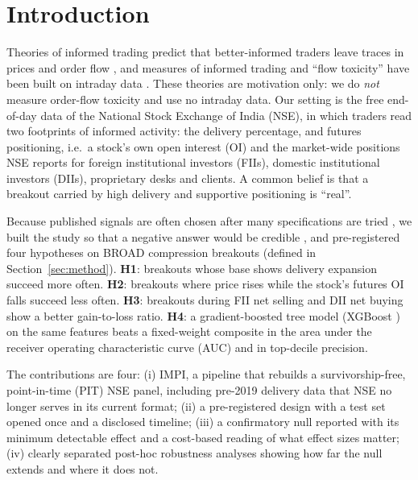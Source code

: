 \documentclass[conference]{IEEEtran}
\begin{document}
\section{Introduction}
Theories of informed trading predict that better-informed traders leave traces in prices and order flow
\cite{kyle1985,glosten1985}, and measures of informed trading and ``flow toxicity'' have been built on
intraday data \cite{easley1996,easley2012}. These theories are motivation only: we do \emph{not} measure
order-flow toxicity and use no intraday data. Our setting is the free end-of-day data of the National Stock
Exchange of India (NSE), in which traders read two footprints of informed activity: the delivery percentage,
and futures positioning, i.e.\ a stock's own open interest (OI) and the market-wide positions NSE reports for
foreign institutional investors (FIIs), domestic institutional investors (DIIs), proprietary desks and
clients. A common belief is that a breakout carried by high delivery and supportive positioning is ``real''.

Because published signals are often chosen after many specifications are tried \cite{harvey2016,bailey2014pseudo},
we built the study so that a negative answer would be credible \cite{nosek2018}, and pre-registered four
hypotheses on BROAD compression breakouts (defined in Section~\ref{sec:method}). \textbf{H1}: breakouts whose
base shows delivery expansion succeed more often. \textbf{H2}: breakouts where price rises while the stock's
futures OI falls succeed less often. \textbf{H3}: breakouts during FII net selling and DII net buying show a
better gain-to-loss ratio. \textbf{H4}: a gradient-boosted tree model (XGBoost \cite{chen2016}) on the same
features beats a fixed-weight composite in the area under the receiver operating characteristic curve (AUC)
and in top-decile precision.

The contributions are four: (i) IMPI, a pipeline that rebuilds a survivorship-free, point-in-time (PIT)
NSE panel, including pre-2019 delivery data that NSE no longer serves in its current format; (ii) a
pre-registered design with a test set opened once and a disclosed timeline; (iii) a confirmatory null
reported with its minimum detectable effect and a cost-based reading of what effect sizes matter; (iv) clearly
separated post-hoc robustness analyses showing how far the null extends and where it does not.

\end{document}
